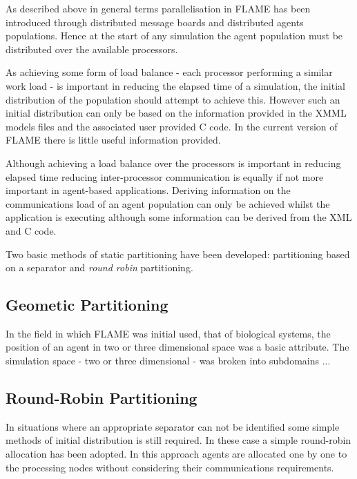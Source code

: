 As described above in general terms parallelisation in FLAME has been introduced through distributed message boards and distributed agents populations. Hence at the start of any simulation the agent population must be distributed over the available processors.

As achieving some form of load balance - each processor performing a similar work load - is important in reducing the elapsed time of a simulation, the initial distribution of the population should attempt to achieve this. However such an initial distribution can only be based on the information provided in the XMML models files and the associated user provided C code. In the current version of FLAME there is little useful information provided.

Although achieving a load balance over the processors is important in reducing elapsed time reducing inter-processor communication is equally if not more important in agent-based applications. Deriving information on the communications load of an agent population can only be achieved whilst the application is executing although some information can be derived from the XML and C code.

Two basic methods of static partitioning have been developed: partitioning based on a separator and \textsl{round robin} partitioning.
\subsection{Geometic Partitioning}
In the field in which FLAME was initial used, that of biological systems, the position of an agent in two or three dimensional space was a basic attribute. The simulation space - two or three dimensional - was broken into subdomains ...
\subsection{Round-Robin Partitioning}
In situations where an appropriate separator can not be identified some simple methods of initial distribution is still required. In these case a simple round-robin allocation has been adopted. In this approach agents are allocated one by one to the processing nodes without considering their communications requirements. 
